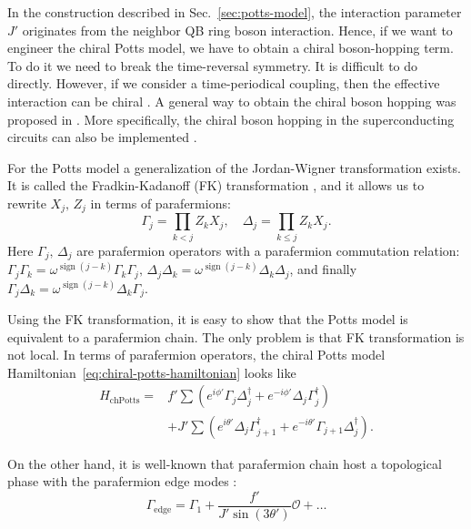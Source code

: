 \documentclass[reprint, aps, prx, amsmath, amssymb, longbibliography, superscriptaddress]{revtex4-2}
\DeclareMathOperator{\sgn}{sign}
\begin{document}
In the construction described in Sec.~\ref{sec:potts-model}, the interaction parameter $J'$ originates from the neighbor QB ring boson interaction. Hence, if we want to engineer the chiral Potts model, we have to obtain a chiral boson-hopping term. To do it we need to break the time-reversal symmetry. It is difficult to do directly. However, if we consider a time-periodical coupling, then the effective interaction can be chiral \cite{roushan_chiral_2017, metelmann_nonreciprocal_2015, owens_quarterflux_2018}. A general way to obtain the chiral boson hopping was proposed in \cite{bermudez_synthetic_2011}. More specifically, the chiral boson hopping in the superconducting circuits can also be implemented \cite{}. 

 For the Potts model a generalization of the Jordan-Wigner transformation exists. It is called the Fradkin-Kadanoff (FK) transformation \cite{fradkin_disorder_1980}, and it allows us to rewrite $X_j, \, Z_j$ in terms of parafermions:
\begin{equation}
\Gamma_j = \prod\limits_{k<j} Z_k X_j , \quad \Delta_j = \prod\limits_{k\le j} Z_k X_j.
\end{equation}
Here $\Gamma_j, \, \Delta_j$ are parafermion operators with a parafermion commutation relation: $\Gamma_j \Gamma_k = \omega^{\sgn(j-k)} \Gamma_k \Gamma_j, \, \Delta_j \Delta_k = \omega^{\sgn(j-k)} \Delta_k \Delta_j$, and finally $\Gamma_j \Delta_k = \omega^{\sgn(j-k)} \Delta_k \Gamma_j$.

Using the FK transformation, it is easy to show that the Potts model is equivalent to a parafermion chain. The only problem is that FK transformation is not local. In terms of parafermion operators, the chiral Potts model Hamiltonian~\eqref{eq:chiral-potts-hamiltonian} looks like 
\begin{equation}
\begin{aligned}
    H_{\text{chPotts}} = &f' \sum \left( e^{i\phi'} \Gamma_j \Delta_j^{\dagger} + e^{-i\phi'} \Delta_j \Gamma_j^{\dagger}\right) \\
    &+J' \sum \left(e^{i\theta'} \Delta_j \Gamma_{j+1}^{\dagger} + e^{-i\theta'} \Gamma_{j+1} \Delta_j^{\dagger}\right).
\end{aligned}
\end{equation}

On the other hand, it is well-known that parafermion chain host a topological phase with the parafermion edge modes  \cite{fendley_parafermionic_2012}:
\begin{equation}
\Gamma_{\text{edge}} = \Gamma_1 + \frac{f'}{J' \sin(3\theta')} \mathcal{O} + \dots
\end{equation}
\end{document}
